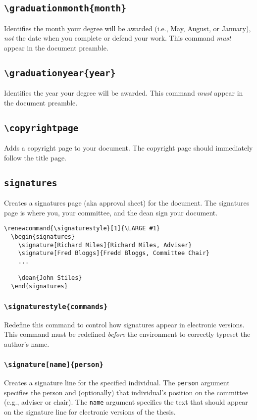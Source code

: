 \documentclass[10pt]{article}
\newcommand{\environment}[1]{\texttt{#1}}
\newcommand{\command}[1]{\texttt{\textbackslash#1}}
\newcommand{\argument}[1]{\texttt{#1}}
\begin{document}
\subsection{\command{graduationmonth\{month\}}}
Identifies the month your degree will be awarded (i.e., May, August, or January), \emph{not} the date when you complete or defend your work.
This command \emph{must} appear in the document preamble.

\subsection{\command{graduationyear\{year\}}}
Identifies the year your degree will be awarded.
This command \emph{must} appear in the document preamble.

\subsection{\command{copyrightpage}}
Adds a copyright page to your document.
The copyright page should immediately follow the title page.

\subsection{\environment{signatures}}
Creates a signatures page (aka approval sheet) for the document.
The signatures page is where you, your committee, and the dean sign your document.

\begin{lstlisting}[gobble=2,float=h]
  \renewcommand{\signaturestyle}[1]{\LARGE #1}
  \begin{signatures}
    \signature[Richard Miles]{Richard Miles, Adviser}
    \signature[Fred Bloggs]{Fredd Bloggs, Committee Chair}
    ...
    
    \dean{John Stiles}
  \end{signatures}
\end{lstlisting}

\subsubsection{\command{signaturestyle\{commands\}}}
Redefine this command to control how signatures appear in electronic versions.
This command must be redefined \emph{before} the environment to correctly typeset the author's name.

\subsubsection{\command{signature[name]\{person\}}}
Creates a signature line for the specified individual.
The \argument{person} argument specifies the person and (optionally) that individual's position on the committee (e.g., adviser or chair).
The \argument{name} argument specifies the text that should appear on the signature line for electronic versions of the thesis.
\end{document}
